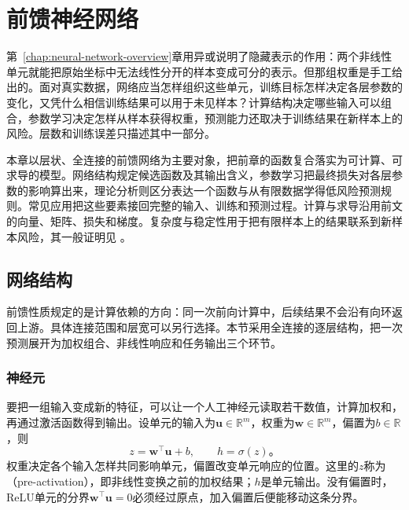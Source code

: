 \chapter{前馈神经网络}
\label{chap:feedforward-networks}

第~\ref{chap:neural-network-overview}章用异或说明了隐藏表示的作用：两个非线性单元就能把原始坐标中无法线性分开的样本变成可分的表示。但那组权重是手工给出的。面对真实数据，网络应当怎样组织这些单元，训练目标怎样决定各层参数的变化，又凭什么相信训练结果可以用于未见样本？计算结构决定哪些输入可以组合，参数学习决定怎样从样本获得权重，预测能力还取决于训练结果在新样本上的风险。层数和训练误差只描述其中一部分。

本章以层状、全连接的前馈网络为主要对象，把前章的函数复合落实为可计算、可求导的模型。网络结构规定候选函数及其输出含义，参数学习把最终损失对各层参数的影响算出来，理论分析则区分表达一个函数与从有限数据学得低风险预测规则。常见应用把这些要素接回完整的输入、训练和预测过程。计算与求导沿用前文的向量、矩阵、损失和梯度。复杂度与稳定性用于把有限样本上的结果联系到新样本风险，其一般证明见
。

\section{网络结构}
\label{sec:ffn-structure}

前馈性质规定的是计算依赖的方向：同一次前向计算中，后续结果不会沿有向环返回上游。具体连接范围和层宽可以另行选择。本节采用全连接的逐层结构，把一次预测展开为加权组合、非线性响应和任务输出三个环节。

\subsection{神经元}
\label{sec:ffn-neuron}

要把一组输入变成新的特征，可以让一个人工神经元读取若干数值，计算加权和，再通过激活函数得到输出。设单元的输入为$\bm{u}\in\mathbb{R}^{m}$，权重为$\bm{w}\in\mathbb{R}^{m}$，偏置为$b\in\mathbb{R}$，则
\begin{equation}
  z=\bm{w}^{\top}\bm{u}+b,
  \qquad h=\sigma(z)\text{。}
  \label{eq:ffn-unit}
\end{equation}
权重决定各个输入怎样共同影响单元，偏置改变单元响应的位置。这里的$z$称为（pre-activation），即非线性变换之前的加权结果；$h$是单元输出。没有偏置时，ReLU单元的分界$\bm{w}^{\top}\bm{u}=0$必须经过原点，加入偏置后便能移动这条分界。

